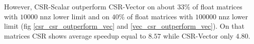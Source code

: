 \documentclass{article}
\begin{document}
\begin{figure}[H]
\centering
{}
\qquad %
\end{figure}

However, CSR-Scalar outperform CSR-Vector on about $33\%$ of float matrices with $10000$ nnz lower limit and on $40\%$ of float matrices with $100000$ nnz lower limit 
(fig \ref{csr_csr_outperform_vec} and \ref{vec_csr_outperform_vec}). On that matrices CSR shows average speedup equal to $8.57$ while CSR-Vector
only $4.80$. 
\end{document}
